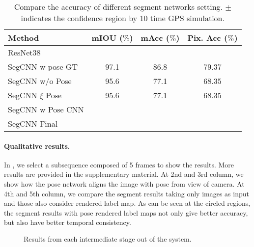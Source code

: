 \begin{table}[t]
\center
\begin{tabular}{lccc}
\toprule[0.1 em]
Method &  mIOU ($\%$) & mAcc ($\%$) & Pix. Acc ($\%$)\\
\hline
ResNet38~\cite{WuSH16e} & & &  \\
SegCNN w pose GT & 97.1 & 86.8 & 79.37 \\
SegCNN w/o Pose & 95.6 & 77.1 & 68.35 \\
SegCNN $\xi$ Pose & 95.6 & 77.1 & 68.35 \\
SegCNN w Pose CNN & & & \\
SegCNN Final & & & \\
\toprule[0.1 em]
\end{tabular}
\caption{Compare the accuracy of different segment networks setting. $\pm$ indicates the confidence region by 10 time GPS simulation.}
\label{tbl:segment}
\vspace{-0.3\baselineskip}
\end{table}

\paragraph{Qualitative results.} In , we select a subsequence composed of 5 frames to show the results. More results are provided in the supplementary material. At 2nd and 3rd column, we show how the pose network aligns the image with pose from view of camera. At 4th and 5th column, we compare the segment results taking only images as input and those also consider rendered label map. As can be seen at the circled regions, the segment results with pose rendered label maps not only give better accuracy, but also have better temporal consistency.
\begin{figure*}[t]
\fbox{\rule{0pt}{2in} \rule{.9\linewidth}{0pt}}
   \caption{Results from each intermediate stage out of the system.}
\label{fig:results}
\end{figure*}